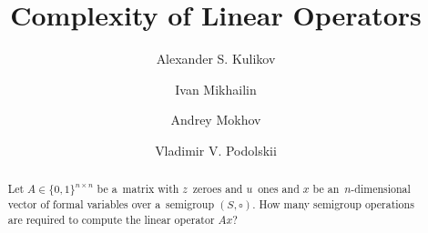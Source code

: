 \documentclass{toc}
\begin{document}
\begin{frontmatter}%



\title{Complexity of Linear Operators}



\author[kulikov]{Alexander S. Kulikov}
\author[mikhailin]{Ivan Mikhailin}
\author[mokhov]{Andrey Mokhov}
\author[podolskii]{Vladimir V. Podolskii}

\begin{abstract}
    Let $A \in \{0,1\}^{n \times n}$ be a~matrix with $z$~zeroes and $u$~ones
    and $x$ be an~$n$-dimensional vector of formal variables over a~semigroup
    $(S, \circ)$. How many semigroup operations are required to compute the
    linear operator $Ax$?


\end{abstract}
\end{frontmatter}
\end{document}
